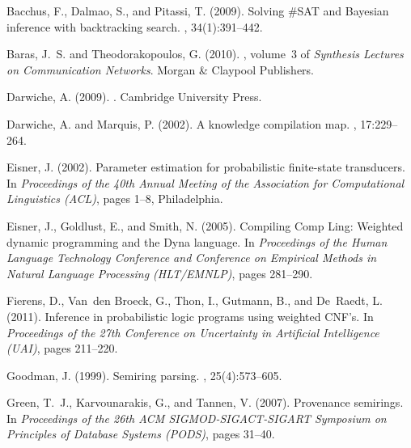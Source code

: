 \documentclass{article}
\theoremstyle{plain}
\theoremstyle{definition}
\begin{document}
\begin{thebibliography}{}

Bacchus, F., Dalmao, S., and Pitassi, T. (2009).
\newblock Solving \#{SAT} and {B}ayesian inference with backtracking search.
, 34(1):391--442.

Baras, J.~S. and Theodorakopoulos, G. (2010).
, volume~3 of {\em Synthesis Lectures
  on Communication Networks}.
\newblock Morgan {\&} Claypool Publishers.

Darwiche, A. (2009).
.
\newblock Cambridge University Press.

Darwiche, A. and Marquis, P. (2002).
\newblock A knowledge compilation map.
, 17:229--264.

Eisner, J. (2002).
\newblock Parameter estimation for probabilistic finite-state transducers.
\newblock In {\em Proceedings of the 40th Annual Meeting of the Association for
  Computational Linguistics (ACL)}, pages 1--8, Philadelphia.

Eisner, J., Goldlust, E., and Smith, N. (2005).
\newblock Compiling {C}omp {L}ing: Weighted dynamic programming and the {D}yna
  language.
\newblock In {\em Proceedings of the Human Language Technology Conference and
  Conference on Empirical Methods in Natural Language Processing (HLT/EMNLP)},
  pages 281--290.

Fierens, D., Van~den Broeck, G., Thon, I., Gutmann, B., and De~Raedt, L.
  (2011).
\newblock Inference in probabilistic logic programs using weighted {CNF}'s.
\newblock In {\em Proceedings of the 27th Conference on Uncertainty in
  Artificial Intelligence (UAI)}, pages 211--220.

Goodman, J. (1999).
\newblock Semiring parsing.
, 25(4):573--605.

Green, T.~J., Karvounarakis, G., and Tannen, V. (2007).
\newblock Provenance semirings.
\newblock In {\em Proceedings of the 26th ACM SIGMOD-SIGACT-SIGART Symposium on
  Principles of Database Systems (PODS)}, pages 31--40.


\end{thebibliography}
\end{document}
